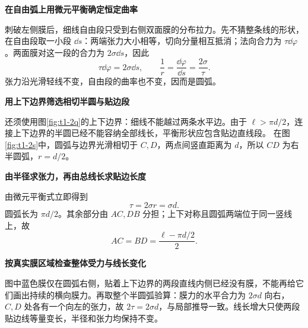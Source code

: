 \begin{solution}\textbf{在自由弧上用微元平衡确定恒定曲率}\par\nobreak
刺破左侧膜后，细线自由段只受到右侧双面膜的分布拉力。先不猜整条线的形状，在自由段取一小段 $\dd s$：两端张力大小相等，切向分量相互抵消；法向合力为 $\tau\dd\varphi$。两面膜对这一段的合力为 $2\sigma\dd s$，因此
\[\tau\dd\varphi=2\sigma\dd s,\qquad \frac1r=\frac{\dd\varphi}{\dd s}=\frac{2\sigma}{\tau}.\]
张力沿光滑轻线不变，自由段的曲率也不变，因而是圆弧。



\par\medskip{}\noindent\textbf{用上下边界筛选相切半圆与贴边段}\par\nobreak
还须使用图\ref{fig:t1-2q}的上下边界：细线不能越过两条水平边。由于 $\ell>\pi d/2$，连接上下边界的半圆已经不能容纳全部线长，平衡形状应包含贴边直线段。
在图\ref{fig:t1-2s}中，圆弧与边界光滑相切于 $C,D$，两点间竖直距离为 $d$，所以 $CD$ 为右半圆弧，$r=d/2$。



\par\medskip{}\noindent\textbf{由半径求张力，再由总线长求贴边长度}\par\nobreak
由微元平衡式立即得到
\[\boxed{\tau=2\sigma r=\sigma d}.\]
圆弧长为 $\pi d/2$。其余部分由 $AC,DB$ 分担；上下对称且圆弧两端位于同一竖线上，故
\[\boxed{AC=BD=\frac{\ell-\pi d/2}{2}}.\]


\par\medskip{}\noindent\textbf{按真实膜区域检查整体受力与线长变化}\par\nobreak
图中蓝色膜仅在圆弧右侧，贴着上下边界的两段直线内侧已经没有膜，不能再给它们画出持续的横向膜力。再取整个半圆弧验算：膜力的水平合力为 $2\sigma d$ 向右，$C,D$ 处各有一个向左的张力，故 $2\tau=2\sigma d$，与局部推导一致。线长增大只使两段贴边线等量变长，半径和张力均保持不变。
\end{solution}
